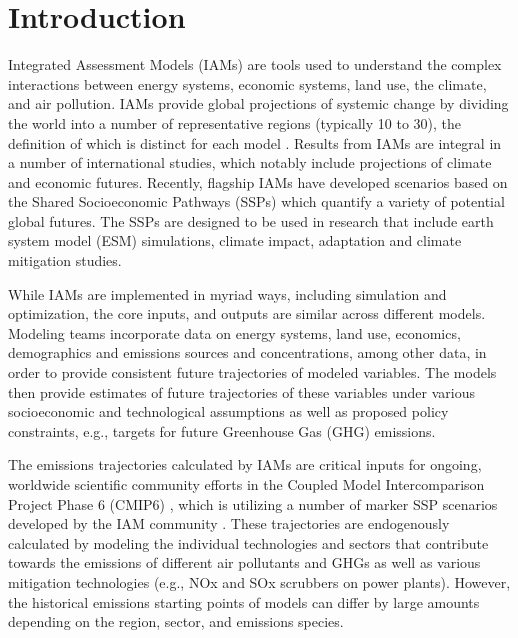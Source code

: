 \section{Introduction}

Integrated Assessment Models (IAMs) are tools used to understand the complex
interactions between energy systems, economic systems, land use, the climate,
and air pollution. IAMs provide global projections of
systemic change by dividing the world into a number of representative regions
(typically 10 to 30), the definition of which is distinct for each model
\cite{krey_global_2014}. Results from IAMs are integral in a number of
international studies, which notably include projections of climate and economic
futures. Recently, flagship IAMs have developed scenarios based on the Shared
% 
% 
Socioeconomic Pathways (SSPs) \cite{van_vuuren_energy_2017, fricko_marker_2017,
  fujimori_ssp3:_2017, calvin_ssp4:_2017, kriegler_fossil-fueled_2017} which
quantify a variety of potential global futures. The SSPs are  designed
to be used in  research that include earth system
model (ESM) simulations, climate impact, adaptation and climate mitigation
studies. 

While IAMs are implemented in myriad ways, including simulation and
optimization, the core inputs, and outputs  are similar across different
models. Modeling teams incorporate  data on energy systems, land
use, economics, demographics and emissions sources and concentrations, among other
data, in order to provide consistent future trajectories of modeled
variables. The models then provide estimates of future trajectories of these
variables under various socioeconomic and technological assumptions as well as
proposed policy constraints, e.g., targets for future Greenhouse Gas (GHG)
emissions.

The emissions trajectories calculated by IAMs are critical inputs for ongoing,
worldwide scientific community efforts in the Coupled Model Intercomparison
Project Phase 6 (CMIP6) \cite{eyring_overview_2016}, which is utilizing a number
of marker SSP scenarios developed by the IAM community
\cite{oneill_scenario_2016}. These trajectories are endogenously calculated by
modeling the individual technologies and sectors that contribute towards the
emissions of different air pollutants and GHGs as well as various mitigation
technologies (e.g., NOx and SOx scrubbers on power plants). However, the
historical emissions starting points of  models can differ by
large amounts depending on the region, sector, and emissions species.

